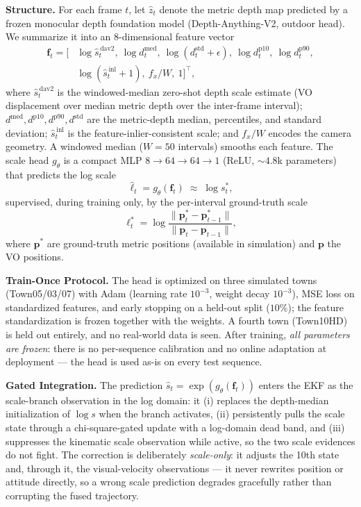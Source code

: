 \textbf{Structure.} For each frame $t$, let $\hat z_t$ denote the metric depth map predicted by a frozen monocular depth foundation model (Depth-Anything-V2, outdoor head). We summarize it into an 8-dimensional feature vector
\begin{align}
    \mathbf{f}_t = \big[&\log \hat s^{\,\mathrm{dav2}}_t,\ \log d^{\mathrm{med}}_t,\ \log (d^{\mathrm{std}}_t{+}\epsilon),\ \log d^{\mathrm{p10}}_t,\ \log d^{\mathrm{p90}}_t, \nonumber\\
    &\log (\hat s^{\,\mathrm{inl}}_t{+}1),\ f_x/W,\ 1\big]^{\top},
    \label{eq:scale_feat}
\end{align}
where $\hat s^{\,\mathrm{dav2}}_t$ is the windowed-median zero-shot depth scale estimate (VO displacement over median metric depth over the inter-frame interval); $d^{\mathrm{med}}, d^{\mathrm{p10}}, d^{\mathrm{p90}}, d^{\mathrm{std}}$ are the metric-depth median, percentiles, and standard deviation; $\hat s^{\,\mathrm{inl}}_t$ is the feature-inlier-consistent scale; and $f_x/W$ encodes the camera geometry. A windowed median ($W{=}50$ intervals) smooths each feature. The scale head $g_\theta$ is a compact MLP $8{\to}64{\to}64{\to}1$ (ReLU, ${\sim}4.8$k parameters) that predicts the log scale
\begin{equation}
    \hat \ell_t = g_\theta(\mathbf{f}_t) \;\approx\; \log s^{*}_t,
    \label{eq:scale_head}
\end{equation}
supervised, during training only, by the per-interval ground-truth scale
\begin{equation}
    \ell^{*}_t = \log \frac{\lVert \mathbf{p}^{*}_t - \mathbf{p}^{*}_{t-1} \rVert}{\lVert \mathbf{p}_t - \mathbf{p}_{t-1} \rVert},
    \label{eq:scale_sup}
\end{equation}
where $\mathbf{p}^{*}$ are ground-truth metric positions (available in simulation) and $\mathbf{p}$ the VO positions.

\textbf{Train-Once Protocol.} The head is optimized on three simulated towns (Town05/03/07) with Adam (learning rate $10^{-3}$, weight decay $10^{-3}$), MSE loss on standardized features, and early stopping on a held-out split ($10\%$); the feature standardization is frozen together with the weights. A fourth town (Town10HD) is held out entirely, and no real-world data is seen. After training, \emph{all parameters are frozen}: there is no per-sequence calibration and no online adaptation at deployment --- the head is used as-is on every test sequence.

\textbf{Gated Integration.} The prediction $\hat s_t = \exp(g_\theta(\mathbf{f}_t))$ enters the EKF as the scale-branch observation in the log domain: it (i) replaces the depth-median initialization of $\log s$ when the branch activates, (ii) persistently pulls the scale state through a chi-square-gated update with a log-domain dead band, and (iii) suppresses the kinematic scale observation while active, so the two scale evidences do not fight. The correction is deliberately \emph{scale-only}: it adjusts the 10th state and, through it, the visual-velocity observations --- it never rewrites position or attitude directly, so a wrong scale prediction degrades gracefully rather than corrupting the fused trajectory.

